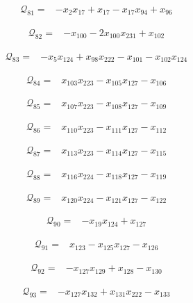 \begin{align*}
\mathcal{Q}_{81}={}&-x_{2}x_{17}+x_{17}-x_{17}x_{94}+x_{96}
\end{align*}

\begin{align*}
\mathcal{Q}_{82}={}&-x_{100}-2x_{100}x_{231}+x_{102}
\end{align*}

\begin{align*}
\mathcal{Q}_{83}={}&-x_{5}x_{124}+x_{98}x_{222}-x_{101}-x_{102}x_{124}
\end{align*}

\begin{align*}
\mathcal{Q}_{84}={}&x_{103}x_{223}-x_{105}x_{127}-x_{106}
\end{align*}

\begin{align*}
\mathcal{Q}_{85}={}&x_{107}x_{223}-x_{108}x_{127}-x_{109}
\end{align*}

\begin{align*}
\mathcal{Q}_{86}={}&x_{110}x_{223}-x_{111}x_{127}-x_{112}
\end{align*}

\begin{align*}
\mathcal{Q}_{87}={}&x_{113}x_{223}-x_{114}x_{127}-x_{115}
\end{align*}

\begin{align*}
\mathcal{Q}_{88}={}&x_{116}x_{224}-x_{118}x_{127}-x_{119}
\end{align*}

\begin{align*}
\mathcal{Q}_{89}={}&x_{120}x_{224}-x_{121}x_{127}-x_{122}
\end{align*}

\begin{align*}
\mathcal{Q}_{90}={}&-x_{19}x_{124}+x_{127}
\end{align*}

\begin{align*}
\mathcal{Q}_{91}={}&x_{123}-x_{125}x_{127}-x_{126}
\end{align*}

\begin{align*}
\mathcal{Q}_{92}={}&-x_{127}x_{129}+x_{128}-x_{130}
\end{align*}

\begin{align*}
\mathcal{Q}_{93}={}&-x_{127}x_{132}+x_{131}x_{222}-x_{133}
\end{align*}


